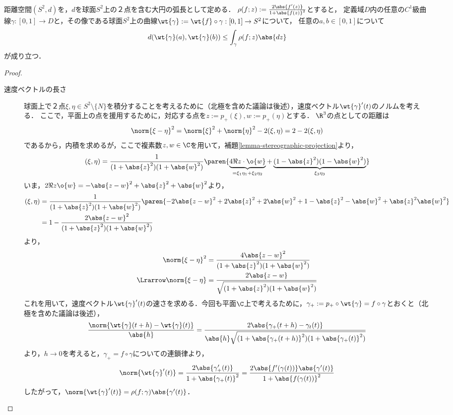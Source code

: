 \documentclass[uplatex, dvipdfmx]{jsreport}
\begin{document}
\begin{lemma}[球面上の距離の評価]
    距離空間$(S^2,d)$を，$d$を球面$S^2$上の２点を含む大円の弧長として定める．
    $\rho(f;z):=\frac{2\abs{f'(z)}}{1+\abs{f(z)}^2}$とすると，
    定義域$D$内の任意の$C^1$級曲線$\gamma:[0,1]\to D$と，その像である球面$S^2$上の曲線$\wt{\gamma}:=\wt{f}\circ\gamma:[0,1]\to S^2$について，
    任意の$a,b\in [0,1]$について
    \[d(\wt{\gamma}(a),\wt{\gamma}(b))\le\int_{\gamma}\rho(f;z)\abs{dz}\]
    が成り立つ．
\end{lemma}
\begin{proof}\mbox{}
    \begin{description}
        \item[速度ベクトルの長さ] 球面上で２点$\xi,\eta\in S^2\setminus\{N\}$を積分することを考えるために（北極を含めた議論は後述），速度ベクトル$\wt{\gamma}'(t)$のノルムを考える．
        ここで，平面上の点を援用するために，対応する点を$z:=p_+(\xi),w:=p_+(\eta)$とする．
        $\R^3$の点としての距離は
        \[\norm{\xi-\eta}^2=\norm{\xi}^2+\norm{\eta}^2-2(\xi,\eta)=2-2(\xi,\eta)\]
        であるから，内積を求めるが，ここで複素数$z,w\in\C$を用いて，補題\ref{lemma-stereographic-projection}より，
        \[(\xi,\eta)=\frac{1}{(1+\abs{z}^2)(1+\abs{w}^2)}\paren{\underbrace{4\Re z\cdot\o{w}}_{=\xi_1\eta_1+\xi_2\eta_2}+\underbrace{(1-\abs{z}^2)(1-\abs{w}^2)}_{\xi_3\eta_3}}\]
        いま，$2\Re z\o{w}=-\abs{z-w}^2+\abs{z}^2+\abs{w}^2$より，
        \begin{align*}
            (\xi,\eta)&=\frac{1}{(1+\abs{z}^2)(1+\abs{w}^2)}\paren{-2\abs{z-w}^2+2\abs{z}^2+2\abs{w}^2+1-\abs{z}^2-\abs{w}^2+\abs{z}^2\abs{w}^2}\\
            &=1-\frac{2\abs{z-w}^2}{(1+\abs{z}^2)(1+\abs{w}^2)}
        \end{align*}
        より，
        \begin{align*}
            \norm{\xi-\eta}^2&=\frac{4\abs{z-w}^2}{(1+\abs{z}^2)(1+\abs{w}^2)}\\
            \Lrarrow\norm{\xi-\eta}&=\frac{2\abs{z-w}}{\sqrt{(1+\abs{z}^2)(1+\abs{w}^2)}}
        \end{align*}
        これを用いて，速度ベクトル$\wt{\gamma}'(t)$の速さを求める．今回も平面$\C$上で考えるために，$\gamma_+:=p_+\circ\wt{\gamma}=f\circ\gamma$とおくと（北極を含めた議論は後述），
        \[\frac{\norm{\wt{\gamma}(t+h)-\wt{\gamma}(t)}}{\abs{h}}=\frac{2\abs{\gamma_+(t+h)-\gamma_t(t)}}{\abs{h}\sqrt{(1+\abs{\gamma_+(t+h)}^2)(1+\abs{\gamma_+(t)}^2)}}\]
        より，$h\to 0$を考えると，$\gamma_+=f\circ\gamma$についての連鎖律より，
        \[\norm{\wt{\gamma}'(t)}=\frac{2\abs{\gamma'_+(t)}}{1+\abs{\gamma_+(t)}^2}=\frac{2\abs{f'(\gamma(t))}\abs{\gamma'(t)}}{1+\abs{f(\gamma(t))}^2}\]
        したがって，$\norm{\wt{\gamma}'(t)}=\rho(f;\gamma)\abs{\gamma'(t)}$．


\end{description}
\end{proof}
\end{document}

